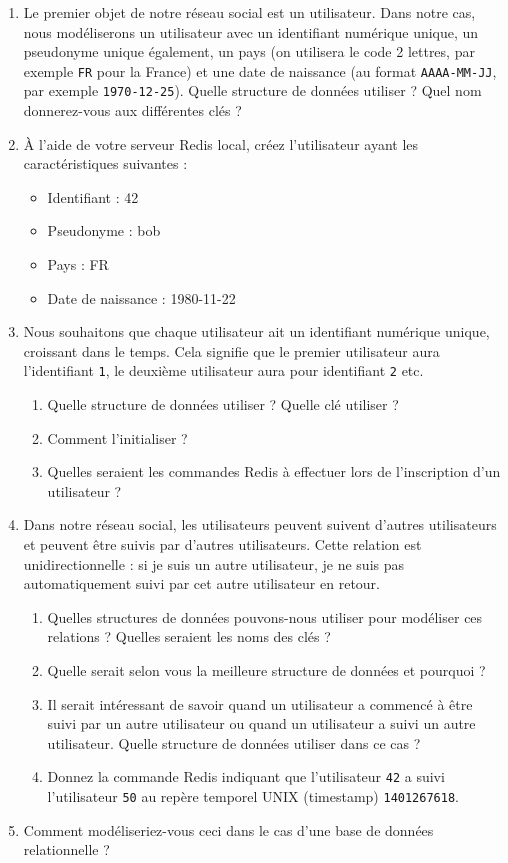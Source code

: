 \documentclass[a4paper,10pt]{article}
\begin{document}
    \begin{enumerate}
      \item Le premier objet de notre réseau social est un utilisateur. Dans notre cas, nous modéliserons un utilisateur avec un identifiant numérique unique, un pseudonyme unique également, un pays (on utilisera le code 2 lettres, par exemple \texttt{FR} pour la France) et une date de naissance (au format \texttt{AAAA-MM-JJ}, par exemple \texttt{1970-12-25}). Quelle structure de données utiliser ? Quel nom donnerez-vous aux différentes clés ?
      \item À l'aide de votre serveur Redis local, créez l'utilisateur ayant les caractéristiques suivantes :
        \begin{itemize}
          \item Identifiant : 42
          \item Pseudonyme : bob
          \item Pays : FR
          \item Date de naissance : 1980-11-22
        \end{itemize}
      \item Nous souhaitons que chaque utilisateur ait un identifiant numérique unique, croissant dans le temps. Cela signifie que le premier utilisateur aura l'identifiant \texttt{1}, le deuxième utilisateur aura pour identifiant \texttt{2} etc.
        \begin{enumerate}
          \item Quelle structure de données utiliser ? Quelle clé utiliser ?
          \item Comment l'initialiser ?
          \item Quelles seraient les commandes Redis à effectuer lors de l'inscription d'un utilisateur ?
        \end{enumerate}
      \item Dans notre réseau social, les utilisateurs peuvent suivent d'autres utilisateurs et peuvent être suivis par d'autres utilisateurs. Cette relation est unidirectionnelle : si je suis un autre utilisateur, je ne suis pas automatiquement suivi par cet autre utilisateur en retour.
        \begin{enumerate}
          \item Quelles structures de données pouvons-nous utiliser pour modéliser ces relations ? Quelles seraient les noms des clés ?
          \item Quelle serait selon vous la meilleure structure de données et pourquoi ?
          \item Il serait intéressant de savoir quand un utilisateur a commencé à être suivi par un autre utilisateur ou quand un utilisateur a suivi un autre utilisateur. Quelle structure de données utiliser dans ce cas ?
          \item Donnez la commande Redis indiquant que l'utilisateur \texttt{42} a suivi l'utilisateur \texttt{50} au repère temporel UNIX (timestamp) \texttt{1401267618}.
        \end{enumerate}
      \item Comment modéliseriez-vous ceci dans le cas d'une base de données relationnelle ?
    \end{enumerate}
\end{document}
